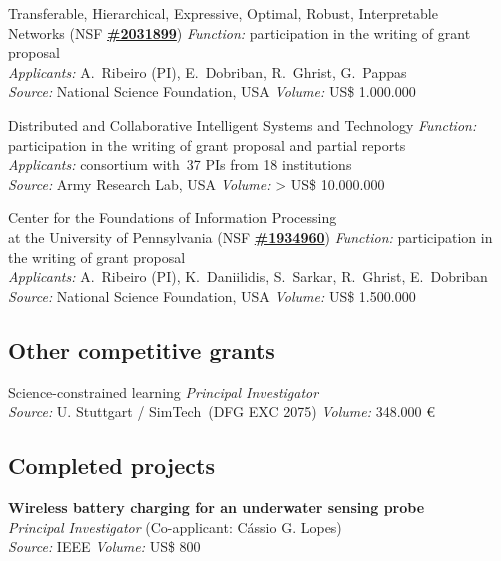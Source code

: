 \documentclass{cvlfoc}
\begin{document}
{\begin{entrydate}
		{Transferable, Hierarchical, Expressive, Optimal, Robust, Interpretable\\Networks
		{\normalfont (NSF \href{https://www.nsf.gov/awardsearch/showAward?AWD_ID=2031899}{\textbf{\#2031899}})}}
		{}
		{\emph{Function:} participation in the writing of grant proposal\\
		\emph{Applicants:} A.\ Ribeiro (PI), E.\ Dobriban, R.\ Ghrist, G.\ Pappas\\
		\emph{Source:} National Science Foundation, USA \hfill \emph{Volume:} US\$ 1.000.000}

		{Distributed and Collaborative Intelligent Systems and Technology}
		{}
		{\emph{Function:} participation in the writing of grant proposal and partial reports\\
		\emph{Applicants:} consortium with~37 PIs from 18 institutions\\
		\emph{Source:} Army Research Lab, USA \hfill \emph{Volume:} > US\$ 10.000.000}

		{Center for the Foundations of Information Processing\\at the University of Pennsylvania
		{\normalfont (NSF \href{https://www.nsf.gov/awardsearch/showAward?AWD_ID=1934960}{\textbf{\#1934960}})}}
		{}
		{\emph{Function:} participation in the writing of grant proposal\\
		\emph{Applicants:} A.\ Ribeiro (PI), K.\ Daniilidis, S.\ Sarkar, R.\ Ghrist, E.\ Dobriban\\
		\emph{Source:} National Science Foundation, USA \hfill \emph{Volume:} US\$ 1.500.000}
\end{entrydate}


\subsection*{Other competitive grants}

\begin{entrydate}
		{Science-constrained learning}
		{}
		{\emph{Principal Investigator}\\
		\emph{Source:} U. Stuttgart / SimTech~(DFG EXC 2075) \hfill \emph{Volume:} 348.000 \euro}
\end{entrydate}


\subsection*{Completed projects}

\begin{entrydate}
		{\textbf{Wireless battery charging for an underwater sensing probe}\\
		\emph{Principal Investigator} (Co-applicant: C\'{a}ssio G. Lopes)\\
		\emph{Source:} IEEE \hfill \emph{Volume:} US\$ 800}
\end{entrydate}
}{}
\end{document}
